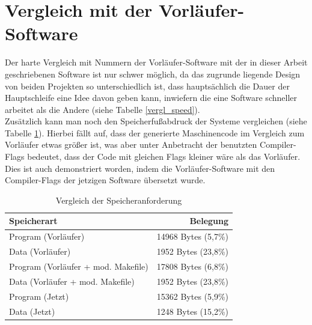 \section{Vergleich mit der Vorläufer-Software}
Der harte Vergleich mit Nummern der Vorläufer-Software mit der in dieser Arbeit geschriebenen Software ist
nur schwer möglich, da das zugrunde liegende Design von beiden Projekten so unterschiedlich ist, dass hauptsächlich
die Dauer der Hauptschleife eine Idee davon geben kann, inwiefern die eine Software schneller arbeitet als die Andere
(siehe Tabelle \ref{vergl_speed}).\\
Zusätzlich kann man noch den Speicherfußabdruck der Systeme vergleichen (siehe Tabelle \ref{vergl_speicher}). Hierbei
fällt auf, dass der generierte Maschinencode im Vergleich zum Vorläufer etwas größer ist, was aber unter Anbetracht
der benutzten Compiler-Flags bedeutet, dass der Code mit gleichen Flags kleiner wäre als das Vorläufer. Dies ist
auch demonstriert worden, indem die Vorläufer-Software mit den Compiler-Flags der jetzigen Software übersetzt
wurde.
\begin{table}[htb]
\begin{center}
	\begin{tabular}{|l||r|}
		\hline
		\textbf{Speicherart} & \textbf{Belegung} \\ \hline \hline
		Program (Vorläufer) & 14968 Bytes (5,7\%)  \\ \hline
		Data (Vorläufer)& 1952 Bytes (23,8\%) \\ \hline \hline
		Program (Vorläufer + mod. Makefile) & 17808 Bytes (6,8\%)  \\ \hline
		Data (Vorläufer + mod. Makefile) & 1952 Bytes (23,8\%) \\ \hline \hline
		Program (Jetzt)& 15362 Bytes (5,9\%) \\ \hline
		Data (Jetzt)& 1248 Bytes (15,2\%) \\ \hline
	\end{tabular}
	\caption{\label{vergl_speicher} Vergleich der Speicheranforderung}
\end{center}
\end{table}
